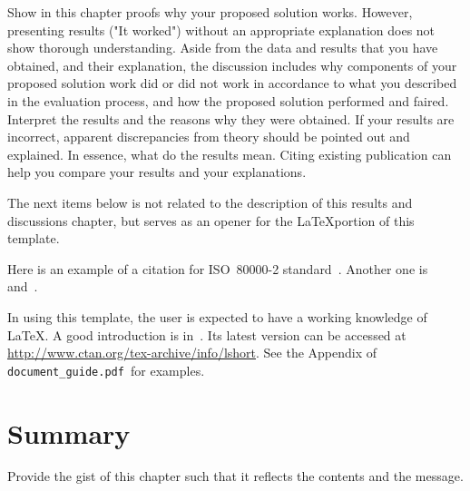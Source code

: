 
Show in this chapter proofs why your proposed solution works.  However, presenting results ("It worked") without an appropriate explanation does not show thorough understanding.  Aside from the data and results that you have obtained, and their explanation, the discussion includes why components of your proposed solution work did or did not work in accordance to what you described in the evaluation process, and how the proposed solution performed and faired. Interpret the results and the reasons why they were obtained.  If your results are incorrect, apparent discrepancies from theory should be pointed out and explained. In essence, what do the results mean.  Citing existing publication can help you compare your results and your explanations. 

The next items below is not related to the description of this results and discussions chapter, but serves as an opener for the \LaTeX portion of this template.

Here is an example of a citation for ISO~80000-2 standard~\cite{ISO800002}. Another one is~\cite{Einstein} and~\cite{croft-78}. 

In using this template, the user is expected to have a working knowledge of \LaTeX. A good introduction is in~\cite{Oetiker2014}.  Its latest version can be accessed at \url{http://www.ctan.org/tex-archive/info/lshort}. See the Appendix of \verb|document_guide.pdf |for examples.



\graytx{\Blindtext}

\section{Summary}

Provide the gist of this chapter such that it reflects the contents and the message.
